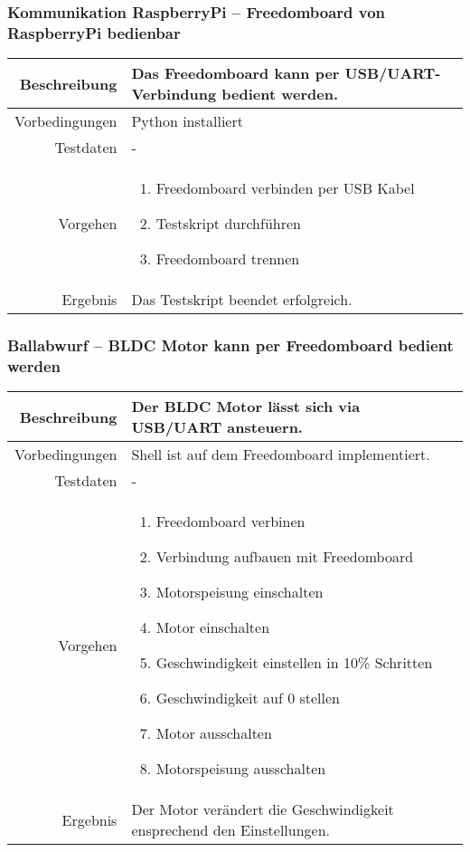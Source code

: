 \subsubsection{Kommunikation RaspberryPi -- Freedomboard von RaspberryPi bedienbar}
\begin{table}[h!]
	\renewcommand{\arraystretch}{1.5}
	\begin{tabular}{|r|p{14cm}|}
		\hline Beschreibung	&
			Das Freedomboard kann per USB/UART-Verbindung bedient werden. \\ 
		\hline Vorbedingungen	& Python installiert \\ 
		\hline Testdaten	& - \\ 
		\hline Vorgehen		& 
		\begin{enumerate}
			\item Freedomboard verbinden per USB Kabel
			\item Testskript durchführen
			\item Freedomboard trennen
		\end{enumerate} \\ 
		\hline Ergebnis 	&
			Das Testskript beendet erfolgreich.\\ 
		\hline 
	\end{tabular}
\end{table}

\newpage
\subsubsection{Ballabwurf -- BLDC Motor kann per Freedomboard bedient werden}
\begin{table}[h!]
	\renewcommand{\arraystretch}{1.5}
	\begin{tabular}{|r|p{14cm}|}
		\hline Beschreibung	& Der BLDC Motor lässt sich via USB/UART ansteuern. \\ 
		\hline Vorbedingungen	& Shell ist auf dem Freedomboard implementiert. \\ 
		\hline Testdaten	& - \\ 
		\hline Vorgehen		& 
		\begin{enumerate}
			\item Freedomboard verbinen
			\item Verbindung aufbauen mit Freedomboard
			\item Motorspeisung einschalten
			\item Motor einschalten
			\item Geschwindigkeit einstellen in 10\% Schritten
			\item Geschwindigkeit auf 0 stellen
			\item Motor ausschalten
			\item Motorspeisung ausschalten 
		\end{enumerate} \\ 
		\hline Ergebnis 	&
			Der Motor verändert die Geschwindigkeit ensprechend
			den Einstellungen.\\ 
		\hline 
	\end{tabular}
\end{table}

